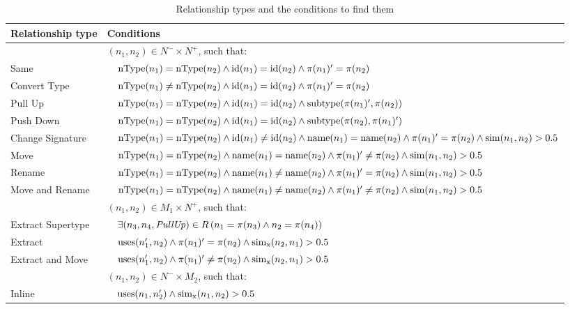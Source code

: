 \begin{table}[htbp]
\renewcommand{\arraystretch}{1.3}
\caption{Relationship types and the conditions to find them}
\label{TabRelationshipTypes}
\centering
\begin{tabular}{@{}lll@{}}
\toprule
Relationship type & \multicolumn{2}{l}{Conditions} \\
\midrule
& \multicolumn{2}{l}{$(n_1, n_2) \in N^- \times N^+$, such that:}\\
Same & & $\operatorname{nType}(n_1) = \operatorname{nType}(n_2) \land \operatorname{id}(n_1) = \operatorname{id}(n_2) \land \operatorname{\pi}(n_1)' = \operatorname{\pi}(n_2)$ \\
Convert Type & & $\operatorname{nType}(n_1) \neq \operatorname{nType}(n_2) \land \operatorname{id}(n_1) = \operatorname{id}(n_2) \land \operatorname{\pi}(n_1)' = \operatorname{\pi}(n_2)$ \\
Pull Up & & $\operatorname{nType}(n_1) = \operatorname{nType}(n_2) \land \operatorname{id}(n_1) = \operatorname{id}(n_2) \land \operatorname{subtype}(\operatorname{\pi}(n_1)', \operatorname{\pi}(n_2))$ \\
Push Down & & $\operatorname{nType}(n_1) = \operatorname{nType}(n_2) \land \operatorname{id}(n_1) = \operatorname{id}(n_2) \land \operatorname{subtype}(\operatorname{\pi}(n_2), \operatorname{\pi}(n_1)')$ \\
Change Signature & & $\operatorname{nType}(n_1) = \operatorname{nType}(n_2) \land \operatorname{id}(n_1) \neq \operatorname{id}(n_2) \land \operatorname{name}(n_1) = \operatorname{name}(n_2) \land \operatorname{\pi}(n_1)' = \operatorname{\pi}(n_2) \land \operatorname{sim}(n_1, n_2) > 0.5$ \\
Move & & $\operatorname{nType}(n_1) = \operatorname{nType}(n_2) \land \operatorname{name}(n_1) = \operatorname{name}(n_2) \land \operatorname{\pi}(n_1)' \neq \operatorname{\pi}(n_2) \land \operatorname{sim}(n_1, n_2) > 0.5$ \\
Rename & & $\operatorname{nType}(n_1) = \operatorname{nType}(n_2) \land \operatorname{name}(n_1) \neq \operatorname{name}(n_2) \land \operatorname{\pi}(n_1)' = \operatorname{\pi}(n_2) \land \operatorname{sim}(n_1, n_2) > 0.5$ \\
Move and Rename & & $\operatorname{nType}(n_1) = \operatorname{nType}(n_2) \land \operatorname{name}(n_1) \neq \operatorname{name}(n_2) \land \operatorname{\pi}(n_1)' \neq \operatorname{\pi}(n_2) \land \operatorname{sim}(n_1, n_2) > 0.5$ \\
\addlinespace
& \multicolumn{2}{l}{$(n_1, n_2) \in M_1 \times N^+$, such that:}\\
Extract Supertype & & $\exists (n_3, n_4, \mathit{PullUp}) \in R\, (n_1 = \operatorname{\pi}(n_3) \land n_2 = \operatorname{\pi}(n_4))$ \\
Extract & & $\operatorname{uses}(n_1', n_2) \land \operatorname{\pi}(n_1)' = \operatorname{\pi}(n_2) \land \operatorname{sim_{x}}(n_2, n_1) > 0.5$ \\
Extract and Move & & $\operatorname{uses}(n_1', n_2) \land \operatorname{\pi}(n_1)' \neq \operatorname{\pi}(n_2) \land \operatorname{sim_{x}}(n_2, n_1) > 0.5$ \\
\addlinespace
& \multicolumn{2}{l}{$(n_1, n_2) \in N^- \times M_2$, such that:}\\
Inline & & $\operatorname{uses}(n_1, n_2') \land \operatorname{sim_{x}}(n_1, n_2) > 0.5$ \\
\bottomrule
\end{tabular}
\end{table}







